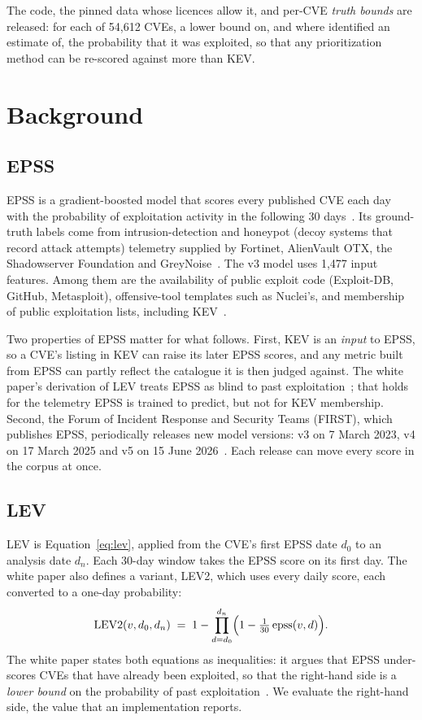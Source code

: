 The code, the pinned data whose licences allow it, and per-CVE \emph{truth
bounds} are released: for each of 54,612 CVEs, a lower bound on, and where
identified an estimate of, the probability that it was exploited, so that any
prioritization method can be re-scored against more than KEV.

\section{Background}\label{sec:background}

\subsection{EPSS}

EPSS is a gradient-boosted model that scores every published CVE each day with
the probability of exploitation activity in the following 30
days~\cite{jacobs2021epss,jacobs2023epssv3}. Its ground-truth labels come from
intrusion-detection and honeypot (decoy systems that record attack attempts)
telemetry supplied by Fortinet, AlienVault
OTX, the Shadowserver Foundation and GreyNoise~\cite{jacobs2023epssv3}. The v3
model uses 1,477 input features. Among them are the availability of public
exploit code (Exploit-DB, GitHub, Metasploit), offensive-tool templates such as
Nuclei's, and membership of public exploitation lists, including
KEV~\cite{jacobs2023epssv3}.

Two properties of EPSS matter for what follows. First, KEV is an \emph{input}
to EPSS, so a CVE's listing in KEV can raise its later EPSS scores, and any
metric built from EPSS can partly reflect the catalogue it is then judged
against. The white paper's derivation of LEV treats EPSS as blind to past
exploitation~\cite[Sec.~5.1]{mell2025lev}; that holds for the telemetry EPSS is
trained to predict, but not for KEV membership. Second, the Forum of Incident Response and Security Teams (FIRST),
which publishes EPSS, periodically releases new model versions: v3 on
7 March 2023, v4 on 17 March 2025 and v5 on 15 June
2026~\cite{epss2026releases}. Each release can move every score in the corpus
at once.

\subsection{LEV}

LEV is Equation~\eqref{eq:lev}, applied from the CVE's first EPSS date $d_0$ to
an analysis date $d_n$. Each 30-day window takes the EPSS score on its first
day. The white paper also defines a variant, LEV2, which uses every daily score,
each converted to a one-day probability:
\begin{equation}\label{eq:lev2}
\mathrm{LEV2}(v, d_0, d_n) \;=\; 1 - \prod_{d=d_0}^{d_n}
\Bigl(1 - \tfrac{1}{30}\,\mathrm{epss}(v, d)\Bigr).
\end{equation}
The white paper states both equations as inequalities: it argues that EPSS
under-scores CVEs that have already been exploited, so that the right-hand
side is a \emph{lower bound} on the probability of past
exploitation~\cite[Sec.~5]{mell2025lev}. We evaluate the right-hand side, the
value that an implementation reports.


